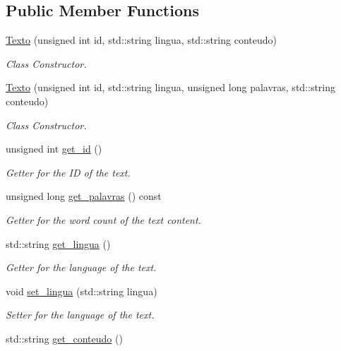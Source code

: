 \subsection*{Public Member Functions}
\begin{DoxyCompactItemize}
\item 
\hyperlink{class_texto_a7034548c1e8e2007b0825ef3a01b1b88}{Texto} (unsigned int id, std\-::string lingua, std\-::string conteudo)
\begin{DoxyCompactList}\small\item\em Class Constructor. \end{DoxyCompactList}\item 
\hyperlink{class_texto_a3ccc9eb8eb980eda5e5f6583cbb60425}{Texto} (unsigned int id, std\-::string lingua, unsigned long palavras, std\-::string conteudo)
\begin{DoxyCompactList}\small\item\em Class Constructor. \end{DoxyCompactList}\item 
unsigned int \hyperlink{class_texto_a4e1b7a020c3b1cffe4518937cdd6f565}{get\-\_\-id} ()
\begin{DoxyCompactList}\small\item\em Getter for the I\-D of the text. \end{DoxyCompactList}\item 
unsigned long \hyperlink{class_texto_a35e3a0a47350f735a2e46380eafde1e0}{get\-\_\-palavras} () const 
\begin{DoxyCompactList}\small\item\em Getter for the word count of the text content. \end{DoxyCompactList}\item 
std\-::string \hyperlink{class_texto_adfaca963b37bef9a739def84e2c810b6}{get\-\_\-lingua} ()
\begin{DoxyCompactList}\small\item\em Getter for the language of the text. \end{DoxyCompactList}\item 
void \hyperlink{class_texto_a297021cc2780c0bf398119bf0e4977e0}{set\-\_\-lingua} (std\-::string lingua)
\begin{DoxyCompactList}\small\item\em Setter for the language of the text. \end{DoxyCompactList}\item 
std\-::string \hyperlink{class_texto_a01a9590011195b1a258e2d3bd247ceb0}{get\-\_\-conteudo} ()

\end{DoxyCompactItemize}
